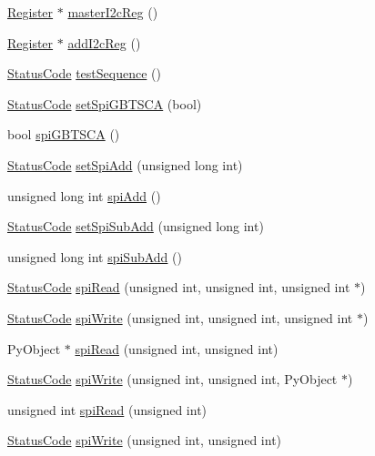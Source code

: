 \begin{DoxyCompactItemize}
\item 
\hyperlink{classRegister}{Register} $\ast$ \hyperlink{classFePGA_a2bcd2c468fc3e1bcadc9bd8800b325a0}{master\+I2c\+Reg} ()
\item 
\hyperlink{classRegister}{Register} $\ast$ \hyperlink{classFePGA_a64feabdb09e65b1b4b1376a4da713570}{add\+I2c\+Reg} ()
\item 
\hyperlink{classStatusCode}{Status\+Code} \hyperlink{classFePGA_a3d5a3231a960cd451bb37bb9120422e9}{test\+Sequence} ()
\item 
\hyperlink{classStatusCode}{Status\+Code} \hyperlink{classFePGA_a59b840619341df26918a6c26e8b8e72b}{set\+Spi\+G\+B\+T\+S\+CA} (bool)
\item 
bool \hyperlink{classFePGA_ad305543bda4d68fe181cd7fa614b2fe1}{spi\+G\+B\+T\+S\+CA} ()
\item 
\hyperlink{classStatusCode}{Status\+Code} \hyperlink{classFePGA_a2cd235d1971625d6742d4f3107489a07}{set\+Spi\+Add} (unsigned long int)
\item 
unsigned long int \hyperlink{classFePGA_a721de3fa12e207392cd6156027d2c776}{spi\+Add} ()
\item 
\hyperlink{classStatusCode}{Status\+Code} \hyperlink{classFePGA_ad0a662adc6070427f0e1962c20a92de6}{set\+Spi\+Sub\+Add} (unsigned long int)
\item 
unsigned long int \hyperlink{classFePGA_a6637adb1cd981cf398ea9f1c3feafe83}{spi\+Sub\+Add} ()
\item 
\hyperlink{classStatusCode}{Status\+Code} \hyperlink{classFePGA_a637b93fed75b576a54e723acb36cb6a3}{spi\+Read} (unsigned int, unsigned int, unsigned int $\ast$)
\item 
\hyperlink{classStatusCode}{Status\+Code} \hyperlink{classFePGA_ac3e8b10fc267b44fef1e651cab77d2ab}{spi\+Write} (unsigned int, unsigned int, unsigned int $\ast$)
\item 
Py\+Object $\ast$ \hyperlink{classFePGA_a41fb676237f8906ec5a0c1b9084ad33e}{spi\+Read} (unsigned int, unsigned int)
\item 
\hyperlink{classStatusCode}{Status\+Code} \hyperlink{classFePGA_aa6aebdd1ccb236f9009a29243f3c7c2b}{spi\+Write} (unsigned int, unsigned int, Py\+Object $\ast$)
\item 
unsigned int \hyperlink{classFePGA_a165f5b70ad30af106ecf9a3ace71d4eb}{spi\+Read} (unsigned int)
\item 
\hyperlink{classStatusCode}{Status\+Code} \hyperlink{classFePGA_ab41df6b1d6a147fbf5611e54058f902d}{spi\+Write} (unsigned int, unsigned int)
\item 

\end{DoxyCompactItemize}
